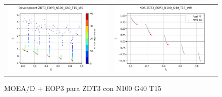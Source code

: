 \begin{figure}[H]
\begin{tabular}{c c}
    \includegraphics[scale=0.5]{figures/ZDT3_EOP3_N100_G40_T15/s99_dev.png} &
    \includegraphics[scale=0.5]{figures/ZDT3_EOP3_N100_G40_T15/s99_nds.png}\\
    \end{tabular}
    \caption{MOEA/D + EOP3 para ZDT3 con N100 G40 T15 }
    \label{fig:10}
\end{figure}

